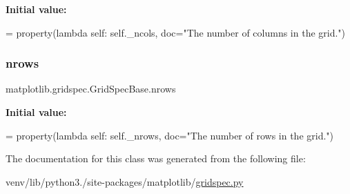 {\bfseries Initial value\+:}
\begin{DoxyCode}
=  property(\textcolor{keyword}{lambda} self: self.\_ncols,
                     doc=\textcolor{stringliteral}{"The number of columns in the grid."})
\end{DoxyCode}
\mbox{\label{classmatplotlib_1_1gridspec_1_1GridSpecBase_a610c62c29d638e1ed969419091c97f74}} 
\subsubsection{\texorpdfstring{nrows}{nrows}}
{\footnotesize\ttfamily matplotlib.\+gridspec.\+Grid\+Spec\+Base.\+nrows\hspace{0.3cm}{\ttfamily [static]}}

{\bfseries Initial value\+:}
\begin{DoxyCode}
=  property(\textcolor{keyword}{lambda} self: self.\_nrows,
                     doc=\textcolor{stringliteral}{"The number of rows in the grid."})
\end{DoxyCode}


The documentation for this class was generated from the following file\+:\begin{DoxyCompactItemize}
\item 
venv/lib/python3./site-\/packages/matplotlib/\hyperlink{gridspec_8py}{gridspec.\+py}\end{DoxyCompactItemize}
